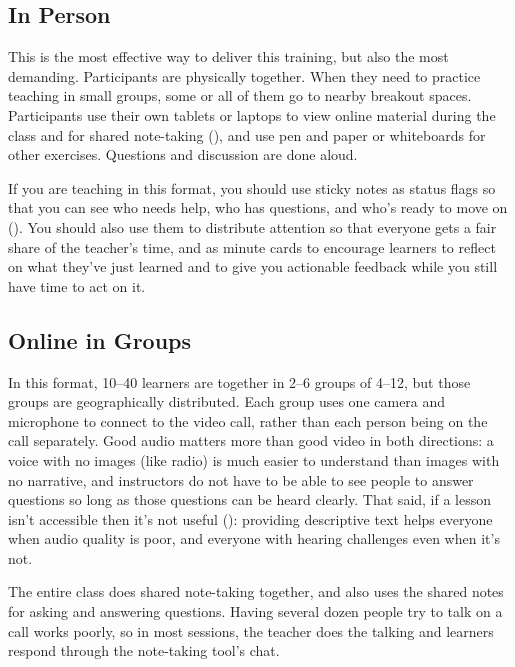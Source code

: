\subsection*{In Person}

This is the most effective way to deliver this training,
but also the most demanding.
Participants are physically together.
When they need to practice teaching in small groups,
some or all of them go to nearby breakout spaces.
Participants use their own tablets or laptops to view online material during the class
and for shared note-taking (),
and use pen and paper or whiteboards for other exercises.
Questions and discussion are done aloud.

If you are teaching in this format,
you should use sticky notes as status flags
so that you can see who needs help,
who has questions,
and who's ready to move on ().
You should also use them to distribute attention
so that everyone gets a fair share of the teacher's time,
and as minute cards to encourage learners to reflect on what they've just learned
and to give you actionable feedback while you still have time to act on it.

\subsection*{Online in Groups}

In this format,
10--40 learners are together in 2--6 groups of 4--12,
but those groups are geographically distributed.
Each group uses one camera and microphone to connect to the video call,
rather than each person being on the call separately.
Good audio matters more than good video in both directions:
a voice with no images (like radio)
is much easier to understand than images with no narrative,
and instructors do not have to be able to see people to answer questions
so long as those questions can be heard clearly.
That said,
if a lesson isn't accessible then it's not useful ():
providing descriptive text helps everyone when audio quality is poor,
and everyone with hearing challenges even when it's not.

The entire class does shared note-taking together,
and also uses the shared notes for asking and answering questions.
Having several dozen people try to talk on a call works poorly,
so in most sessions,
the teacher does the talking and learners respond through the note-taking tool's chat.

